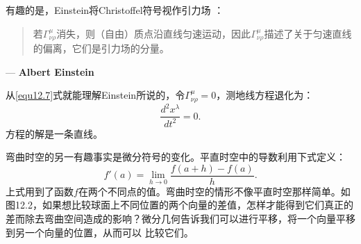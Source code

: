 有趣的是，Einstein将Christoffel符号视作引力场%
%
：
\begin{quote}
若$\Gamma^\mu_{\nu \rho}$消失，则（自由）质点沿直线匀速运动，因此$\Gamma^\mu_{\nu \rho}$描述了关于匀速直线的偏离，它们是引力场的分量。
\end{quote}
\begin{flushright}
--- {\bf Albert Einstein}
\end{flushright}
从\ref{equ12.7}式就能理解Einstein所说的，令$\Gamma^\mu_{\nu \rho} = 0$，测地线方程退化为：
\begin{equation}
\label{equ12.8}
    \frac{d^2 x^\lambda}{dt^2} = 0.
\end{equation}
方程的解是一条直线。

弯曲时空的另一有趣事实是微分符号的变化。平直时空中的导数利用下式定义：
\begin{equation}
\label{equ12.9}
    f'(a) = \lim_{h \to 0} \frac{f(a + h) - f(a)}{h}.
\end{equation}
上式用到了函数$f$在两个不同点的值。弯曲时空的情形不像平直时空那样简单。如图12.2，如果想比较球面上不同位置的两个向量的差值，怎样才能得到它们真正的差而除去弯曲空间造成的影响？微分几何告诉我们可以进行平移，将一个向量平移到另一个向量的位置，从而可以%
%
比较它们。


